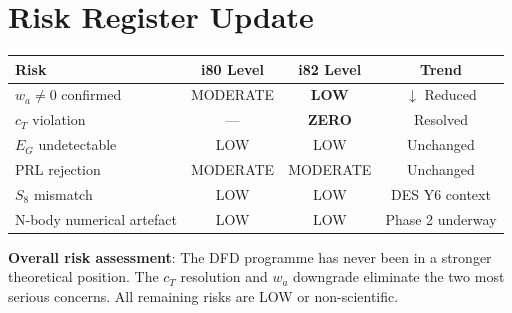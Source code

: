 \documentclass[11pt,a4paper]{article}
\begin{document}
\section{Risk Register Update}

\begin{center}
\begin{tabular}{lccc}
\toprule
\textbf{Risk} & \textbf{i80 Level} & \textbf{i82 Level} & \textbf{Trend} \\
\midrule
$w_a \neq 0$ confirmed & MODERATE & \textbf{LOW} & $\downarrow$ Reduced \\
$c_T$ violation & --- & \textbf{ZERO} & Resolved \\
$E_G$ undetectable & LOW & LOW & Unchanged \\
PRL rejection & MODERATE & MODERATE & Unchanged \\
$S_8$ mismatch & LOW & LOW & DES Y6 context \\
N-body numerical artefact & LOW & LOW & Phase 2 underway \\
\bottomrule
\end{tabular}
\end{center}

\textbf{Overall risk assessment}: The DFD programme has never been in a stronger theoretical position. The $c_T$ resolution and $w_a$ downgrade eliminate the two most serious concerns. All remaining risks are LOW or non-scientific.
\end{document}
